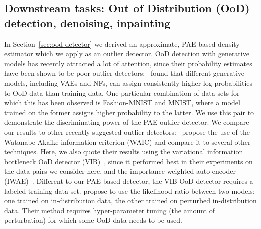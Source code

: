 \documentclass{article}
\begin{document}
\subsection{Downstream tasks: Out of Distribution (OoD) detection, denoising, inpainting}
\label{sec:down}
In Section~\ref{sec:ood-detector} we derived an approximate, PAE-based density estimator which we apply as an outlier detector. OoD detection with generative models has recently attracted a lot of attention, since their probability estimates have been shown to be poor outlier-detectors:~\cite{Nalisnick2019} found that different generative models, including VAEs and NFs, can assign consistently higher log probabilities to OoD data than training data. One particular combination of data sets for which this has been observed is Fashion-MNIST and MNIST, where a model trained on the former assigns higher probability to the latter. We use this pair to demonstrate the discriminating power of the PAE outlier detector. We compare our results to other recently suggested outlier detectors:~\cite{Choi2018} propose the use of the Watanabe-Akaike information criterion (WAIC) and compare it to several other techniques. Here, we also quote their results using the variational information bottleneck OoD detector (VIB)~\citep{Alemi2018}, since it performed best in their experiments on the data pairs we consider here, and the importance weighted auto-encoder (IWAE)~\citep{IWAE}. Different to our PAE-based detector, the VIB OoD-detector requires a labeled training data set.
\cite{LikelihoodRatioAI} propose to use the likelihood ratio between two models: one trained on in-distribution data, the other trained on perturbed in-distribution data. Their method requires hyper-parameter tuning (the amount of perturbation) for which some OoD data needs to be used.
\end{document}
